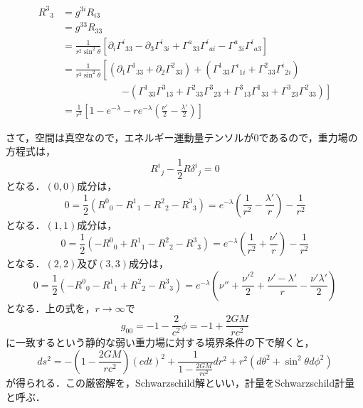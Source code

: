 \documentclass[a4paper]{ltjsreport}
\begin{document}
\begin{align*}
  {R^3}_3 &= g^{3i}R_{i3}\\
  &= g^{33}R_{33}\\
  &= \frac{1}{r^2\sin^2\theta}\left[\partial_i{\Gamma^i}_{33} - \partial_3{\Gamma^i}_{3i} + {\Gamma^a}_{33}{\Gamma^i}_{ai} - {\Gamma^a}_{3i}{\Gamma^i}_{a3}\right]\\
  &= \frac{1}{r^2\sin^2\theta}\left[\left(\partial_1{\Gamma^1}_{33} + \partial_2{\Gamma^2}_{33}\right) + \left({\Gamma^1}_{33}{\Gamma^i}_{1i} + {\Gamma^2}_{33}{\Gamma^i}_{2i}\right) \right.\\
  & \qquad \qquad \qquad \left. - \left({\Gamma^1}_{33}{\Gamma^3}_{13} + {\Gamma^2}_{33}{\Gamma^3}_{23} + {\Gamma^3}_{13}{\Gamma^1}_{33} + {\Gamma^3}_{23}{\Gamma^2}_{33}\right)\right]\\
  &= \frac{1}{r^2}\left[1 - e^{ - \lambda} - re^{ - \lambda}\left(\frac{\nu'}{2} - \frac{\lambda'}{2}\right)\right]
\end{align*}

さて，空間は真空なので，エネルギー運動量テンソルが0であるので，重力場の方程式は，
\[{R^i}_j - \frac{1}{2}R{\delta^i}_j=0\]
となる．$(0, 0)$成分は，
\[0=\frac{1}{2}\left({R^0}_0 - {R^1}_1 - {R^2}_2 - {R^3}_3\right)=e^{ - \lambda}\left(\frac{1}{r^2} - \frac{\lambda'}{r}\right) - \frac{1}{r^2}\]
となる．$(1, 1)$成分は，
\[0=\frac{1}{2}\left( - {R^0}_0 + {R^1}_1 - {R^2}_2 - {R^3}_3\right)=e^{ - \lambda}\left(\frac{1}{r^2} + \frac{\nu'}{r}\right) - \frac{1}{r^2}\]
となる．$(2, 2)$及び$(3, 3)$成分は，
\[0=\frac{1}{2}\left( - {R^0}_0 - {R^1}_1 + {R^2}_2 - {R^3}_3\right)=e^{ - \lambda}\left(\nu'' + \frac{\nu'^2}{2} + \frac{\nu' - \lambda'}{r} - \frac{\nu'\lambda'}{2}\right)\]
となる．上の式を，$r\to\infty$で
\[g_{00}= - 1 - \frac{2}{c^2}\phi= - 1 + \frac{2GM}{rc^2}\]
に一致するという静的な弱い重力場に対する境界条件の下で解くと，
\[ds^2= - \left(1 - \frac{2GM}{rc^2}\right)(cdt)^2 + \frac{1}{1 - \frac{2GM}{rc^2}}dr^2 + r^2(d\theta^2 + \sin^2\theta{}d\phi^2)\]
が得られる．この厳密解を，Schwarzschild解といい，計量をSchwarzschild計量と呼ぶ．
\end{document}
